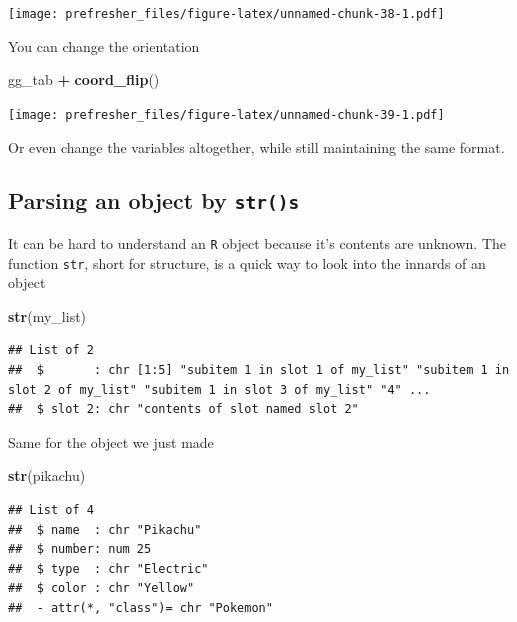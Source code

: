 \documentclass[]{book}
\newenvironment{Shaded}{\begin{snugshade}}{\end{snugshade}}
\newcommand{\KeywordTok}[1]{\textcolor[rgb]{0.13,0.29,0.53}{\textbf{#1}}}
\newcommand{\StringTok}[1]{\textcolor[rgb]{0.31,0.60,0.02}{#1}}
\newcommand{\OperatorTok}[1]{\textcolor[rgb]{0.81,0.36,0.00}{\textbf{#1}}}
\newcommand{\NormalTok}[1]{#1}
\theoremstyle{definition}
\theoremstyle{definition}
\theoremstyle{definition}
\theoremstyle{remark}
\begin{document}
\texttt{[image: prefresher\_files/figure-latex/unnamed-chunk-38-1.pdf]}

You can change the orientation

\begin{Shaded}
\begin{Highlighting}[]
\NormalTok{gg_tab }\OperatorTok{+}\StringTok{ }\KeywordTok{coord_flip}\NormalTok{()}
\end{Highlighting}
\end{Shaded}

\texttt{[image: prefresher\_files/figure-latex/unnamed-chunk-39-1.pdf]}

Or even change the variables altogether, while still maintaining the
same format.

\subsection{\texorpdfstring{Parsing an object by
\texttt{str()s}}{Parsing an object by str()s}}\label{parsing-an-object-by-strs}

It can be hard to understand an \texttt{R} object because it's contents
are unknown. The function \texttt{str}, short for structure, is a quick
way to look into the innards of an object

\begin{Shaded}
\begin{Highlighting}[]
\KeywordTok{str}\NormalTok{(my_list)}
\end{Highlighting}
\end{Shaded}

\begin{verbatim}
## List of 2
##  $       : chr [1:5] "subitem 1 in slot 1 of my_list" "subitem 1 in slot 2 of my_list" "subitem 1 in slot 3 of my_list" "4" ...
##  $ slot 2: chr "contents of slot named slot 2"
\end{verbatim}

Same for the object we just made

\begin{Shaded}
\begin{Highlighting}[]
\KeywordTok{str}\NormalTok{(pikachu)}
\end{Highlighting}
\end{Shaded}

\begin{verbatim}
## List of 4
##  $ name  : chr "Pikachu"
##  $ number: num 25
##  $ type  : chr "Electric"
##  $ color : chr "Yellow"
##  - attr(*, "class")= chr "Pokemon"
\end{verbatim}
\end{document}
